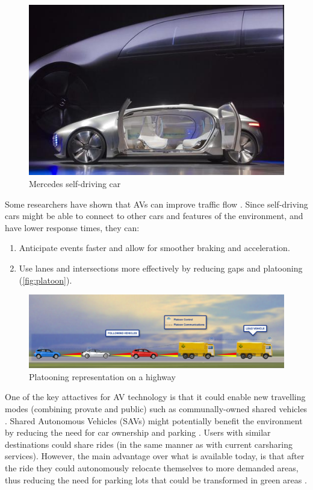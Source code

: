 \begin{figure}[htb]
  \myfloatalign
  \includegraphics[width=\linewidth]{pictures/01/mercedes}
  \caption[Mercedes self-driving car]{Mercedes self-driving car}
  \label{fig:mercedes}
\end{figure} 

 Some researchers have shown that AVs can improve traffic flow . Since self-driving cars might be able to connect to other cars and features of the environment, and have lower response times, they can: 
\begin{enumerate} 
  \item Anticipate events faster and allow for smoother braking and acceleration.
  \item Use lanes and intersections more effectively by reducing gaps and platooning (\autoref{fig:platoon}).
\end{enumerate}

\begin{figure}[htb]
  \centering
  \includegraphics[width=\linewidth]{pictures/01/platoon}
  \caption{Platooning representation on a highway}
  \label{fig:platoon}
\end{figure}

 One of the key attactives for AV technology is that it could enable new travelling modes (combining provate and public) such as communally-owned shared vehicles . Shared Autonomous Vehicles (SAVs) might potentially benefit the environment by reducing the need for car ownership and parking . Users with similar destinations could share rides (in the same manner as with current carsharing services). However, the main advantage over what is available today, is that after the ride they could autonomously relocate themselves to more demanded areas, thus reducing the need for parking lots that could be transformed in green areas . 

